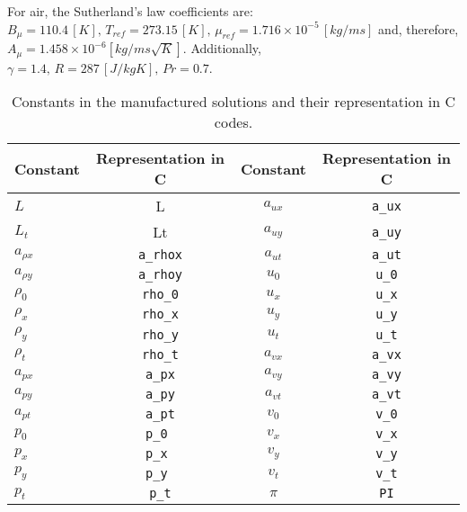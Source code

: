 \documentclass[10pt]{article}
\begin{document}
For air, the Sutherland's law coefficients are: $B_\mu   = 110.4 \, [K], \, T_{ref} = 273.15 \, [K],  \, \mu_{ref} = 1.716\times 10^{-5}\, [kg/ms]$ and, therefore, $A_\mu=1.458\times 10^{-6} [kg /ms\sqrt{K}]$. Additionally, $\gamma  = 1.4 ,\, R = 287 \, [J/kg K],\, Pr  = 0.7$. 
\begin{table}[hptb]
\caption{Constants in the manufactured solutions and their representation in C codes.}
\centering
\begin{tabular}{l c | c c}
\hline\hline
 Constant     & Representation in C &  Constant     & Representation in C \\ [0.25ex]
\hline 
$L$			  & L	   				& $ a_{ux}$ 	& \texttt{a\_ux}  \\    
$ L_{t}$ 	  & Lt	   				& $ a_{uy}$ 	& \texttt{a\_uy}  \\
$ a_{\rho x}$ & \texttt{a\_rhox}	& $ a_{ut}$ 	& \texttt{a\_ut}  \\
$ a_{\rho y}$ & \texttt{a\_rhoy}	& $ u_{0}$ 	    & \texttt{u\_0}   \\ 
$ \rho_{0}$   & \texttt{rho\_0}		& $ u_{x}$ 	    & \texttt{u\_x}   \\ 
$ \rho_{x}$   & \texttt{rho\_x}   	& $ u_{y}$ 	    & \texttt{u\_y}   \\ 
$ \rho_{y}$   & \texttt{rho\_y}   	& $ u_{t}$ 	    & \texttt{u\_t}   \\
$ \rho_{t}$   & \texttt{rho\_t}     & $ a_{vx}$ 	& \texttt{a\_vx}  \\
$ a_{px}$ 	  & \texttt{a\_px}  	& $ a_{vy}$ 	& \texttt{a\_vy}  \\
$ a_{py}$ 	  &	\texttt{a\_py}   	& $ a_{vt}$ 	& \texttt{a\_vt}  \\  
$ a_{pt}$ 	  & \texttt{a\_pt}    	& $ v_{0}$ 	    & \texttt{v\_0}   \\ 
$ p_{0}$ 	  & \texttt{p\_0 }  	& $ v_{x}$ 	    & \texttt{v\_x}   \\ 
$ p_{x}$ 	  & \texttt{p\_x }    	& $ v_{y}$		& \texttt{v\_y}   \\ 
$ p_{y}$      &	\texttt{p\_y }  	& $ v_{t}$		& \texttt{v\_t}   \\ 
$ p_{t}$      & \texttt{p\_t}   	& $\pi$         & \texttt{PI}     \\
\hline
\end{tabular}
\label{table_aux_var02}
\end{table}
\end{document}
